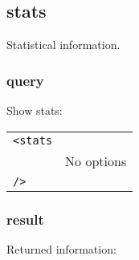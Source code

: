 \documentclass[10pt]{article}
\begin{document}
%
%

\subsection{stats}
Statistical information.

\subsubsection{query}
Show stats:

\begin{tabular}{p{2.6cm}p{8.5cm}}
\verb|<stats|   & \\
\verb|     |    & No options \\
\verb|/>|       &
\end{tabular}

\subsubsection{result}
Returned information:
\end{document}
